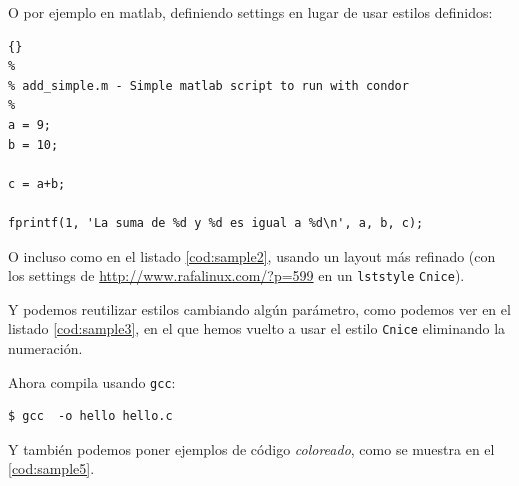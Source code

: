 
\begin{codefloat}

\caption{Ejemplo de código fuente con un \texttt{lstinputlisting} dentro
de un \texttt{codefloat}}
\label{cod:sample1}
\end{codefloat}


O por ejemplo en matlab, definiendo settings en lugar de usar estilos
definidos:

\lstset{language=matlab}
\lstset{tabsize=2}
\lstset{commentstyle=\textit}
\lstset{stringstyle=\ttfamily, basicstyle=\small}
\begin{lstlisting}[frame=trbl]{}
%
% add_simple.m - Simple matlab script to run with condor
%
a = 9;
b = 10;

c = a+b;

fprintf(1, 'La suma de %d y %d es igual a %d\n', a, b, c);
\end{lstlisting}

O incluso como en el listado \ref{cod:sample2}, usando un layout más refinado (con
los settings de \url{http://www.rafalinux.com/?p=599} en un \texttt{lststyle}
\texttt{Cnice}).


\begin{codefloat}

\caption{Ejemplo de código fuente con estilo \texttt{Cnice}, de nuevo
  con un \texttt{lstinputlisting} dentro de un \texttt{codefloat}}
\label{cod:sample2}
\end{codefloat}

Y podemos reutilizar estilos cambiando algún parámetro, como podemos ver
en el listado \ref{cod:sample3}, en el que hemos vuelto a usar el estilo
\texttt{Cnice} eliminando la numeración.


\begin{codefloat}

\caption{Ejemplo de código fuente con estilo \texttt{Cnice}, modificado
para que no aparezca la numeración.}
\label{cod:sample3}
\end{codefloat}


\noindent
Ahora compila usando \texttt{gcc}:


\begin{lstlisting}[style=console, numbers=none]
$ gcc  -o hello hello.c
\end{lstlisting}

Y también podemos poner ejemplos de código \textit{coloreado}, como se
muestra en el \ref{cod:sample5}.


